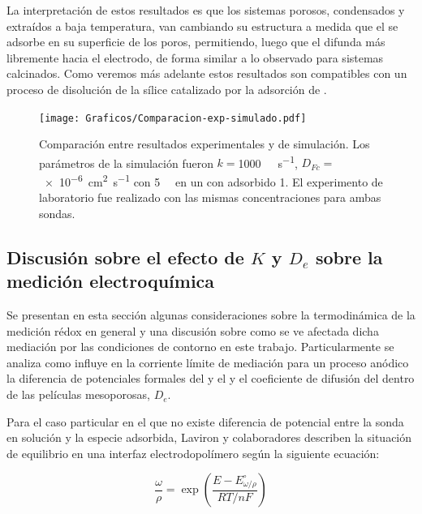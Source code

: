 		La interpretación de estos resultados es que los sistemas porosos, condensados y extraídos a baja temperatura, van cambiando su estructura a medida que el \ru\space se adsorbe en su superficie de los poros, permitiendo, luego que el \fc\space difunda más libremente hacia el electrodo, de forma similar a lo observado para sistemas calcinados. Como veremos más adelante estos resultados son compatibles con un proceso de disolución de la sílice catalizado por la adsorción de \aminorutenio.

				\begin{figure}[t!]
					\centering
			 	    \texttt{[image: Graficos/Comparacion-exp-simulado.pdf]}
			        \caption[Simulación EQ comparadas con datos experimentales]{Comparación entre resultados experimentales y de simulación. Los parámetros de la simulación fueron $k=$\SI{1000}{\per\Molar\per\second}, $D_{Fc}\!=$ \SI{e-6}{\square\cm\per\second} con \fc\space \SI{5}{\milli\Molar} en un \pdm\space con \ru\space adsorbido \SI{1}{\Molar}. El experimento de laboratorio fue realizado con las mismas concentraciones para ambas sondas.}
			        \label{fig:comp_sim_exp}
			      	\end{figure}

	\subsection{Discusión sobre el efecto de \texorpdfstring{$K$}{K} y \texorpdfstring{$D_e$}{De} sobre la medición electroquímica}

		Se presentan en esta sección algunas consideraciones sobre la termodinámica de la medición rédox en general y una discusión sobre como se ve afectada dicha mediación por las condiciones de contorno en este trabajo. Particularmente se analiza como influye en la corriente límite de mediación para un proceso anódico la diferencia de potenciales formales del \ru\space y el \fc\space y el coeficiente de difusión del \ru\space dentro de las películas mesoporosas, $D_e$.

		Para el caso particular en el que no existe diferencia de potencial entre la sonda en solución y la especie adsorbida, Laviron y colaboradores\cite{laviron1983} describen la situación de equilibrio en una interfaz electrodo\textbar polímero según la siguiente ecuación:

			\begin{equation}
				\frac{\omega}{\rho} = \exp{\left(\frac{E-E_{\omega / \rho}^{\circ}}{RT/nF}\right)}
				\label{eq:laviron}
			\end{equation}

